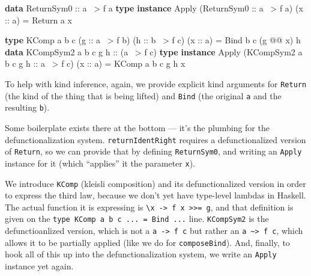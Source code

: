 \documentclass[]{article}
\newenvironment{Shaded}{}{}
\newcommand{\KeywordTok}[1]{\textcolor[rgb]{0.00,0.44,0.13}{\textbf{{#1}}}}
\newcommand{\DataTypeTok}[1]{\textcolor[rgb]{0.56,0.13,0.00}{{#1}}}
\newcommand{\OtherTok}[1]{\textcolor[rgb]{0.00,0.44,0.13}{{#1}}}
\newcommand{\FunctionTok}[1]{\textcolor[rgb]{0.02,0.16,0.49}{{#1}}}
\newcommand{\NormalTok}[1]{{#1}}
\begin{document}
\begin{Shaded}
\begin{Highlighting}[]
\KeywordTok{data} \DataTypeTok{ReturnSym0}\OtherTok{ ::} \NormalTok{a }\FunctionTok{~>} \NormalTok{f a}
\KeywordTok{type} \KeywordTok{instance} \DataTypeTok{Apply} \NormalTok{(}\DataTypeTok{ReturnSym0}\OtherTok{ ::} \NormalTok{a }\FunctionTok{~>} \NormalTok{f a) (}\OtherTok{x ::} \NormalTok{a) }\FunctionTok{=} \DataTypeTok{Return} \NormalTok{a x}

\KeywordTok{type} \DataTypeTok{KComp} \NormalTok{a b c (}\OtherTok{g ::} \NormalTok{a }\FunctionTok{~>} \NormalTok{f b) (}\OtherTok{h ::} \NormalTok{b }\FunctionTok{~>} \NormalTok{f c) (}\OtherTok{x ::} \NormalTok{a) }\FunctionTok{=} \DataTypeTok{Bind} \NormalTok{b c (g }\FunctionTok{@@} \NormalTok{x) h}
\KeywordTok{data} \DataTypeTok{KCompSym2} \NormalTok{a b c g}\OtherTok{ h ::} \NormalTok{(a }\FunctionTok{~>} \NormalTok{f c)}
\KeywordTok{type} \KeywordTok{instance} \DataTypeTok{Apply} \NormalTok{(}\DataTypeTok{KCompSym2} \NormalTok{a b c g}\OtherTok{ h ::} \NormalTok{a }\FunctionTok{~>} \NormalTok{f c) (}\OtherTok{x ::} \NormalTok{a) }\FunctionTok{=} \DataTypeTok{KComp} \NormalTok{a b c g h x}
\end{Highlighting}
\end{Shaded}

To help with kind inference, again, we provide explicit kind arguments for
\texttt{Return} (the kind of the thing that is being lifted) and \texttt{Bind}
(the original \texttt{a} and the resulting \texttt{b}).

Some boilerplate exists there at the bottom --- it's the plumbing for the
defunctionalization system. \texttt{returnIdentRight} requires a
defunctionalized version of \texttt{Return}, so we can provide that by defining
\texttt{ReturnSym0}, and writing an \texttt{Apply} instance for it (which
``applies'' it the parameter \texttt{x}).

We introduce \texttt{KComp} (kleisli composition) and its defunctionalized
version in order to express the third law, because we don't yet have type-level
lambdas in Haskell. The actual function it is expressing is
\texttt{\textbackslash{}x\ -\textgreater{}\ f\ x\ \textgreater{}\textgreater{}=\ g},
and that definition is given on the
\texttt{type\ KComp\ a\ b\ c\ ...\ =\ Bind\ ...} line. \texttt{KCompSym2} is the
defunctioanlized version, which is not a \texttt{a\ -\textgreater{}\ f\ c} but
rather an \texttt{a\ \textasciitilde{}\textgreater{}\ f\ c}, which allows it to
be partially applied (like we do for \texttt{composeBind}). And, finally, to
hook all of this up into the defunctionalization system, we write an
\texttt{Apply} instance yet again.
\end{document}
